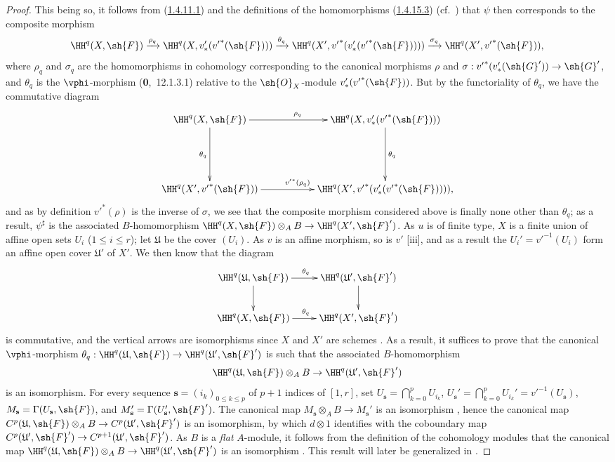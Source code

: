 \begin{proof}
This being so, it follows from (\hyperref[III.1.4.11.1]{1.4.11.1}) and the definitions of the homomorphisms (\hyperref[III.1.4.15.3]{1.4.15.3}) (cf.~) that $\psi$ then corresponds to the composite morphism
\[
  \HH^q(X,\sh{F})\xrightarrow{\rho_q}\HH^q(X,v_*'({v'}^*(\sh{F})))\xrightarrow{\theta_q}\HH^q(X',{v'}^*(v_*'({v'}^*(\sh{F}))))\xrightarrow{\sigma_q}\HH^q(X',{v'}^*(\sh{F})),
\]
where $\rho_q$ and $\sigma_q$ are the homomorphisms in cohomology corresponding to the canonical morphisms $\rho$ and $\sigma:{v'}^*(v_*'(\sh{G}'))\to\sh{G}'$, and $\theta_q$ is the $\vphi$-morphism (\textbf{0},~12.1.3.1) relative to the $\sh{O}_X$-module $v_*'({v'}^*(\sh{F}))$.
But by the functoriality of $\theta_q$, we have the commutative diagram
\[
  \xymatrix{
    \HH^q(X,\sh{F})\ar[rr]^{\rho_q}\ar[dd]_{\theta_q} & &
    \HH^q(X,v_*'({v'}^*(\sh{F})))\ar[dd]^{\theta_q}\\\\
    \HH^q(X',{v'}^*(\sh{F}))\ar[rr]^{{v'}^*(\rho_q)} & &
    \HH^q(X',{v'}^*(v_*'({v'}^*(\sh{F})))),
  }
\]
and as by definition  ${v'}^*(\rho)$ is the inverse of $\sigma$, we see that the composite morphism considered above is finally none other than $\theta_q$; as a result, $\psi^\sharp$ is the associated $B$-homomorphism $\HH^q(X,\sh{F})\otimes_A B\to\HH^q(X',\sh{F}')$.
As $u$ is of finite type, $X$ is a finite union of affine open sets $U_i$ ($1\leq i\leq r$); let $\mathfrak{U}$ be the cover $(U_i)$.
As $v$ is an affine morphism, so is $v'$ [iii], and as a result the $U_i'={v'}^{-1}(U_i)$ form an affine open cover $\mathfrak{U}'$ of $X'$.
We then know  that the diagram
\[
  \xymatrix{
    \HH^q(\mathfrak{U},\sh{F})\ar[r]^{\theta_q}\ar[d] &
    \HH^q(\mathfrak{U}',\sh{F}')\ar[d]\\
    \HH^q(X,\sh{F})\ar[r]^{\theta_q} &
    \HH^q(X',\sh{F}')
  }
\]
is commutative, and the vertical arrows are isomorphisms since $X$ and $X'$ are schemes .
As a result, it suffices to prove that the canonical $\vphi$-morphism $\theta_q:\HH^q(\mathfrak{U},\sh{F})\to\HH^q(\mathfrak{U}',\sh{F}')$ is such that the associated $B$-homomorphism
\[
  \HH^q(\mathfrak{U},\sh{F})\otimes_A B\to\HH^q(\mathfrak{U}',\sh{F}')
\]
is an isomorphism.
For every sequence $\mathbf{s}=(i_k)_{0\leq k\leq p}$ of $p+1$ indices of $[1,r]$, set $U_\mathbf{s}=\bigcap_{k=0}^p U_{i_k}$, $U_\mathbf{s}'=\bigcap_{k=0}^p U_{i_k}'={v'}^{-1}(U_\mathbf{s})$, $M_\mathbf{s}=\Gamma(U_\mathbf{s},\sh{F})$, and $M_\mathbf{s}'=\Gamma(U_\mathbf{s}',\sh{F}')$.
The canonical map $M_\mathbf{s}\otimes_A B\to M_\mathbf{s}'$ is an isomorphism , hence the canonical map $C^p(\mathfrak{U},\sh{F})\otimes_A B\to C^p(\mathfrak{U}',\sh{F}')$ is an isomorphism, by which $d\otimes 1$ identifies with the coboundary map $C^p(\mathfrak{U}',\sh{F}')\to C^{p+1}(\mathfrak{U}',\sh{F}')$.
As $B$ is a \emph{flat} $A$-module, it follows from the definition of the cohomology modules that the canonical map $\HH^q(\mathfrak{U},\sh{F})\otimes_A B\to\HH^q(\mathfrak{U}',\sh{F}')$ is an isomorphism .
This result will later be generalized in \hyperref[section:III.6]{}.
\end{proof}


